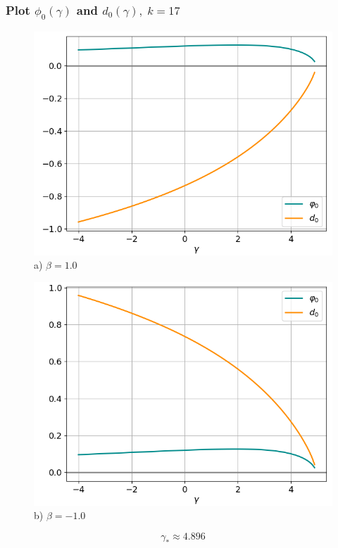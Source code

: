 \documentclass[fullscreen=true, unicode, bookmarks=false]{beamer}
\begin{document}
\begin{frame}
\frametitle{ Plot $ \phi_0(\gamma) $ and $ d_0(\gamma), \; k = 17 $ }

\begin{figure} 
\begin{minipage}[h]{0.49\linewidth}
\begin{center}
\includegraphics[scale=0.37]{oscillating_phi0d0_x0_033_beta_10.png} \\ {\scriptsize a) $ \beta = 1.0 $}
\end{center}
\end{minipage} 
\hfill
\begin{minipage}[h]{0.49\linewidth}
\begin{center}
\includegraphics[scale=0.37]{oscillating_phi0d0_x0_033_beta_-10.png}  \\ {\scriptsize b) $ \beta = -1.0 $}
\end{center}
\end{minipage} 
\end{figure}
$$ \gamma_* \approx 4.896 $$

\end{frame}
\end{document}
